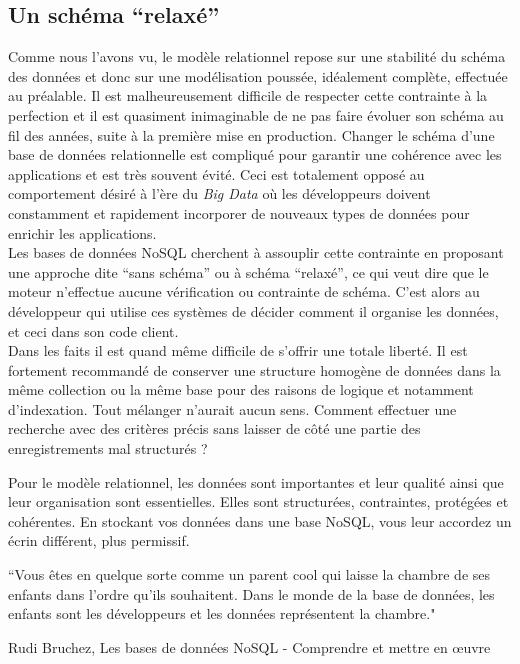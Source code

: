 \subsection{Un schéma \enquote{relaxé}}
	Comme nous l'avons vu, le modèle relationnel repose sur une stabilité du schéma des données et donc sur une modélisation poussée, idéalement complète, effectuée au préalable. Il est malheureusement difficile de respecter cette contrainte à la perfection et il est quasiment inimaginable de ne pas faire évoluer son schéma au fil des années, suite à la première mise en production. Changer le schéma d'une base de données relationnelle est compliqué pour garantir une cohérence avec les applications et est très souvent évité. Ceci est totalement opposé au comportement désiré à l'ère du \textit{Big Data} où les développeurs doivent constamment et rapidement incorporer de nouveaux types de données pour enrichir les applications.\\

	Les bases de données NoSQL cherchent à assouplir cette contrainte en proposant une approche dite \enquote{sans schéma} ou à schéma \enquote{relaxé}, ce qui veut dire que le moteur n'effectue aucune vérification ou contrainte de schéma. C'est alors au développeur qui utilise ces systèmes de décider comment il organise les données, et ceci dans son code client.\\

	Dans les faits il est quand même difficile de s'offrir une totale liberté. Il est fortement recommandé de conserver une structure homogène de données dans la même collection ou la même base pour des raisons de logique et notamment d'indexation. Tout mélanger n'aurait aucun sens. Comment effectuer une recherche avec des critères précis sans laisser de côté une partie des enregistrements mal structurés ?

	Pour le modèle relationnel, les données sont importantes et leur qualité ainsi que leur organisation sont essentielles. Elles sont structurées, contraintes, protégées et cohérentes. En stockant vos données dans une base NoSQL, vous leur accordez un écrin différent, plus permissif.
	\epigraph{``Vous êtes en quelque sorte comme un parent cool qui laisse la chambre de ses enfants dans l'ordre qu'ils souhaitent. Dans le monde de la base de données, les enfants sont les développeurs et les données représentent la chambre."}{\textup{Rudi Bruchez}, Les bases de données NoSQL - Comprendre et mettre en œuvre \cite{BD_NoSQL}}
